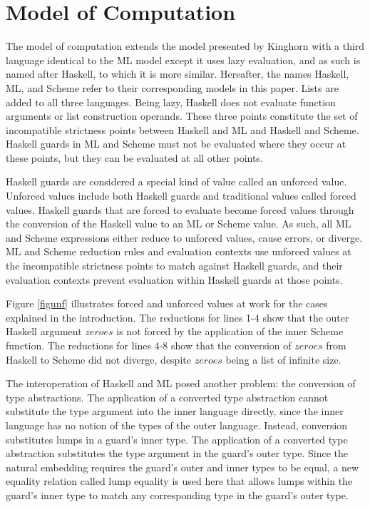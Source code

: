 \section{Model of Computation}

The model of computation extends the model presented by Kinghorn \cite{kinghorn07} with a third language identical to the ML model except it uses lazy evaluation, and as such is named after Haskell, to which it is more similar. Hereafter, the names Haskell, ML, and Scheme refer to their corresponding models in this paper. Lists are added to all three languages. Being lazy, Haskell does not evaluate function arguments or list construction operands. These three points constitute the set of incompatible strictness points between Haskell and ML and Haskell and Scheme. Haskell guards in ML and Scheme must not be evaluated where they occur at these points, but they can be evaluated at all other points.

Haskell guards are considered a special kind of value called an unforced value. Unforced values include both Haskell guards and traditional values called forced values. Haskell guards that are forced to evaluate become forced values through the conversion of the Haskell value to an ML or Scheme value. As such, all ML and Scheme expressions either reduce to unforced values, cause errors, or diverge. ML and Scheme reduction rules and evaluation contexts use unforced values at the incompatible strictness points to match against Haskell guards, and their evaluation contexts prevent evaluation within Haskell guards at those points.

Figure \ref{figunf} illustrates forced and unforced values at work for the cases explained in the introduction. The reductions for lines 1-4 show that the outer Haskell argument $zeroes$ is not forced by the application of the inner Scheme function. The reductions for lines 4-8 show that the conversion of $zeroes$ from Haskell to Scheme did not diverge, despite $zeroes$ being a list of infinite size.



The interoperation of Haskell and ML posed another problem: the conversion of type abstractions. The application of a converted type abstraction cannot substitute the type argument into the inner language directly, since the inner language has no notion of the types of the outer language. Instead, conversion substitutes lumps in a guard's inner type. The application of a converted type abstraction substitutes the type argument in the guard's outer type. Since the natural embedding \cite{matthews07} requires the guard's outer and inner types to be equal, a new equality relation called lump equality is used here that allows lumps within the guard's inner type to match any corresponding type in the guard's outer type.

